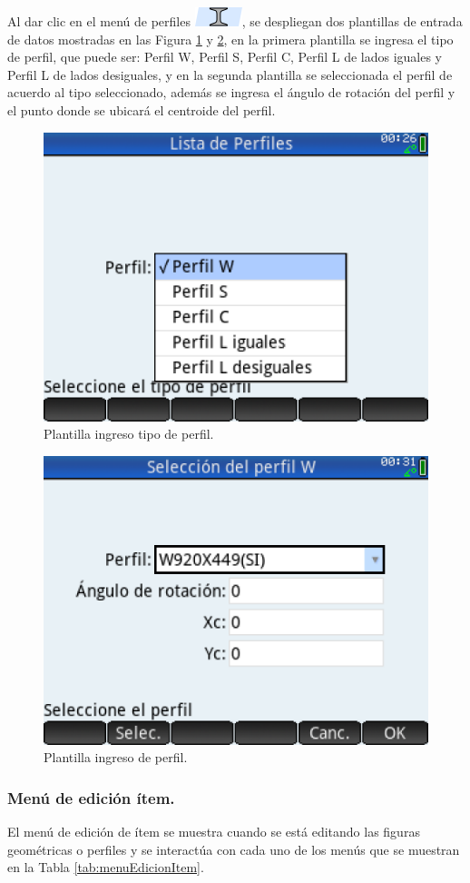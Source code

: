 \documentclass[spanish,xcolor=pdftex,dvipsnames,table,mathserif]{scrartcl}
\begin{document}
Al dar clic en el menú de perfiles \includegraphics{imagenes/men_perfil}, se despliegan dos plantillas de entrada de datos mostradas en las Figura \ref{fig:per1} y \ref{fig:per2}, en la primera plantilla se ingresa el tipo de perfil, que puede ser: Perfil W, Perfil S, Perfil C, Perfil L de lados iguales y Perfil L de lados desiguales, y en la segunda plantilla se seleccionada el perfil de acuerdo al tipo seleccionado, además se ingresa el ángulo de rotación del perfil y el punto donde se ubicará el centroide del perfil.
\begin{figure}[H]
	\centering
	\caption[Plantilla ingreso tipo de perfil.]{Plantilla ingreso tipo de perfil.}
	\label{fig:per1}
	\includegraphics[width=0.45\linewidth]{imagenes/ingresoTipoPerfil}
\end{figure}
\begin{figure}[H]
	\centering
	\caption[Plantilla ingreso de perfil.]{Plantilla ingreso de perfil.}
	\label{fig:per2}
	\includegraphics[width=0.45\linewidth]{imagenes/ingresoPerfil}
\end{figure}
\subsubsection{Menú de edición ítem.}
El menú de edición de ítem se muestra cuando se está editando las figuras geométricas o perfiles y se interactúa con cada uno de los menús que se muestran en la Tabla \ref{tab:menuEdicionItem}.
\end{document}
